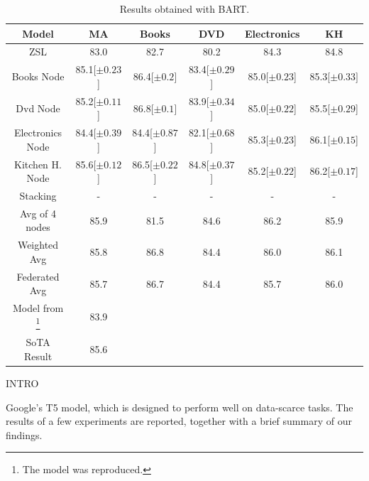     \begin{table}[h!]
      \centering
      \hspace*{-40pt}\begin{tabular}{|c|c|c|c|c|c|}
        \hline
        Model & MA & Books & DVD & Electronics & KH \\
        \hline
        ZSL & 83.0 & 82.7 & 80.2 & 84.3 & 84.8 \\
        Books Node & 85.1[$\pm 0.23$] & 86.4[$\pm 0.2$] & 83.4[$\pm 0.29$] & 85.0[$\pm 0.23$] & 85.3[$\pm 0.33]$ \\
        Dvd Node & 85.2[$\pm 0.11$] & 86.8[$\pm 0.1$] & 83.9[$\pm 0.34$] & 85.0[$\pm 0.22$] & 85.5[$\pm 0.29$]  \\
        Electronics Node & 84.4[$\pm 0.39$] & 84.4[$\pm 0.87$] & 82.1[$\pm 0.68$] & 85.3[$\pm 0.23$] & 86.1[$\pm 0.15$] \\
        Kitchen H. Node & 85.6[$\pm 0.12$] & 86.5[$\pm 0.22$] & 84.8[$\pm 0.37$] & 85.2[$\pm 0.22$] & 86.2[$\pm 0.17$]  \\
        Stacking & - & - & - & - & - \\ 
        Avg of 4 nodes & 85.9 & 81.5 & 84.6 & 86.2 & 85.9  \\
        Weighted Avg & 85.8 & 86.8 & 84.4 & 86.0 & 86.1  \\
        Federated Avg & 85.7 & 86.7 & 84.4 & 85.7 & 86.0  \\
        Model from \cite{geng-etal-2019-induction}\footnote{The model was reproduced.} & 83.9 & & & & \\
        SoTA Result \cite{geng-etal-2019-induction} & 85.6 & & & & \\
        \hline
      \end{tabular}
      \caption{Results obtained with BART.}\label{Tab:bart_results}
    \end{table}


INTRO

Google's T5 model, which is designed to perform well on data-scarce tasks. The results of a few experiments are reported, together with a brief summary of our findings.


